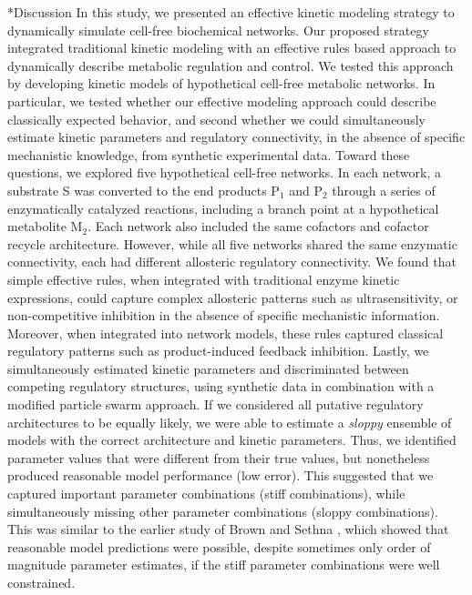 \documentclass[12pt]{article}
\makeatletter
\renewcommand\section{\@startsection
	{subsection}{2}{0mm}
	{-0.2in}
	{0.05\baselineskip}
	{\normalfont\large\bfseries}}
\makeatother
\begin{document}
\clearpage

\section*{Discussion}
In this study, we presented an effective kinetic modeling strategy to dynamically simulate cell-free biochemical networks. 
Our proposed strategy integrated traditional kinetic modeling with an effective rules based approach to dynamically describe metabolic regulation and control. 
We tested this approach by developing kinetic models of hypothetical cell-free metabolic networks. 
In particular, we tested whether our effective modeling approach could describe classically expected behavior, and second whether we could simultaneously estimate kinetic parameters and regulatory connectivity, in the absence of specific mechanistic knowledge, from synthetic experimental data. 
Toward these questions, we explored five hypothetical cell-free networks. 
In each network, a substrate S was converted to the end products P$_{1}$ and P$_{2}$ through a series of enzymatically catalyzed reactions, including a branch point at a hypothetical metabolite M$_{2}$. 
Each network also included the same cofactors and cofactor recycle architecture. 
However, while all five networks shared the same enzymatic connectivity, each had different allosteric regulatory connectivity. 
We found that simple effective rules, when integrated with traditional enzyme kinetic expressions, could capture complex allosteric patterns such as ultrasensitivity, or non-competitive inhibition in the absence of specific mechanistic information. Moreover, when integrated into network models, these rules captured classical regulatory patterns such as product-induced feedback inhibition. 
Lastly, we simultaneously estimated kinetic parameters and discriminated between competing regulatory structures, using synthetic data in combination with a modified particle swarm approach.
If we considered all putative regulatory architectures to be equally likely, we were able to estimate a \textit{sloppy} ensemble of models with the correct architecture and kinetic parameters.
Thus, we identified parameter values that were different from their true values, but nonetheless produced reasonable model performance (low error). This suggested that we captured important parameter combinations (stiff combinations), while simultaneously missing other parameter combinations (sloppy combinations). This was similar to the earlier study of Brown and Sethna \citep{Brown:2003aa}, 
which showed that reasonable model predictions were possible, despite sometimes only order of magnitude parameter estimates, if the stiff parameter combinations were well constrained. 
\end{document}
